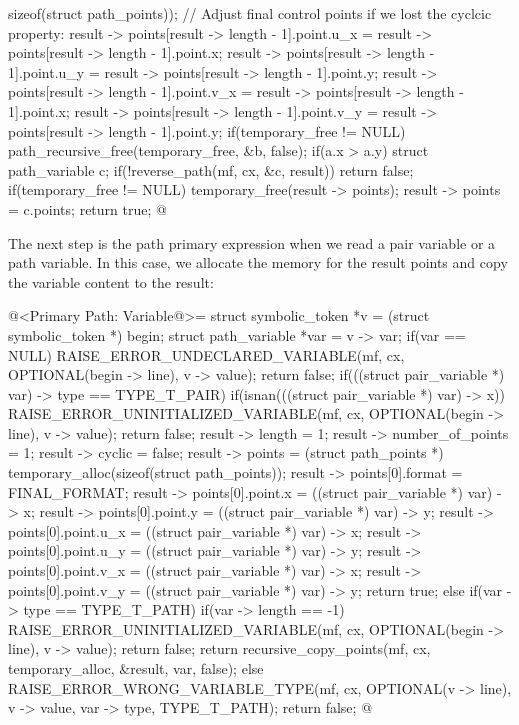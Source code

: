{{{{{{           sizeof(struct path_points));
  // Adjust final control points if we lost the cyclcic property:
  result -> points[result -> length - 1].point.u_x =
                                result -> points[result -> length - 1].point.x;
  result -> points[result -> length - 1].point.u_y =
                                result -> points[result -> length - 1].point.y;
  result -> points[result -> length - 1].point.v_x =
                                result -> points[result -> length - 1].point.x;
  result -> points[result -> length - 1].point.v_y =
                                result -> points[result -> length - 1].point.y;
  if(temporary_free != NULL)
    path_recursive_free(temporary_free, &b, false);
  if(a.x > a.y){
    struct path_variable c;
    if(!reverse_path(mf, cx, &c, result))
      return false;
    if(temporary_free != NULL)
      temporary_free(result -> points);
    result -> points = c.points;
  }
  return true;
}
@
\fimcodigo

The next step is the path primary expression when we read a pair
variable or a path variable. In this case, we allocate the memory for
the result points and copy the variable content to the result:

\iniciocodigo
@<Primary Path: Variable@>=
{
  struct symbolic_token *v = (struct symbolic_token *) begin;
  struct path_variable *var = v -> var;
  if(var == NULL){
    RAISE_ERROR_UNDECLARED_VARIABLE(mf, cx, OPTIONAL(begin -> line),
                                   v -> value);
    return false;
  }
  if(((struct pair_variable *) var) -> type == TYPE_T_PAIR){
    if(isnan(((struct pair_variable *) var) -> x)){
      RAISE_ERROR_UNINITIALIZED_VARIABLE(mf, cx, OPTIONAL(begin -> line),
                                        v -> value);
      return false;
    }
    result -> length = 1;
    result -> number_of_points = 1;
    result -> cyclic = false;
    result -> points = (struct path_points *)
                         temporary_alloc(sizeof(struct path_points));
    result -> points[0].format = FINAL_FORMAT;
    result -> points[0].point.x = ((struct pair_variable *) var) -> x;
    result -> points[0].point.y = ((struct pair_variable *) var) -> y;
    result -> points[0].point.u_x = ((struct pair_variable *) var) -> x;
    result -> points[0].point.u_y = ((struct pair_variable *) var) -> y;
    result -> points[0].point.v_x = ((struct pair_variable *) var) -> x;
    result -> points[0].point.v_y = ((struct pair_variable *) var) -> y;
    return true;
  }
  else if(var -> type == TYPE_T_PATH){
    if(var -> length == -1){
      RAISE_ERROR_UNINITIALIZED_VARIABLE(mf, cx, OPTIONAL(begin -> line),
                                        v -> value);
      return false;
    }
    return recursive_copy_points(mf, cx, temporary_alloc, &result, var, false);
  }
  else{
    RAISE_ERROR_WRONG_VARIABLE_TYPE(mf, cx, OPTIONAL(v -> line), v -> value, 
                                     var -> type, TYPE_T_PATH);
    return false;
  }
}
@
\fimcodigo

}}}}}
